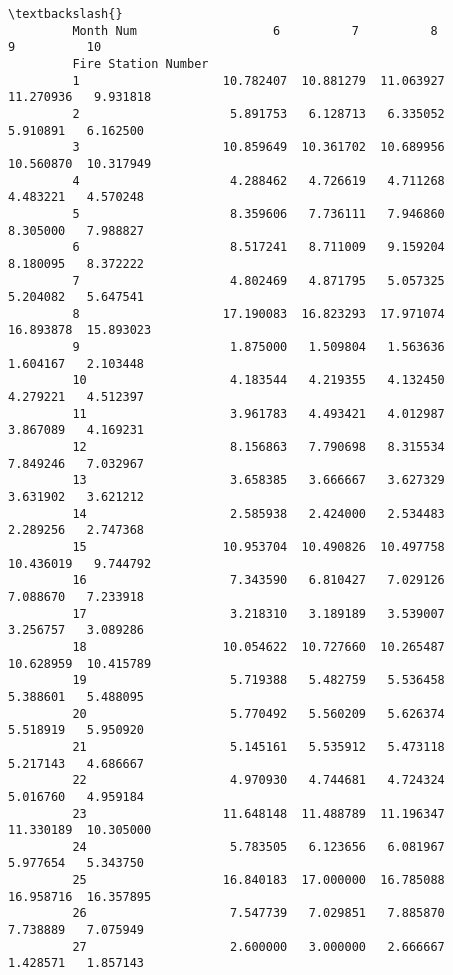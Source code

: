 \documentclass[11pt]{article}
\begin{document}
\begin{Verbatim}[commandchars=\\\{\}]
                                                                                     \textbackslash{}
         Month Num                   6          7          8          9          10   
         Fire Station Number                                                          
         1                    10.782407  10.881279  11.063927  11.270936   9.931818   
         2                     5.891753   6.128713   6.335052   5.910891   6.162500   
         3                    10.859649  10.361702  10.689956  10.560870  10.317949   
         4                     4.288462   4.726619   4.711268   4.483221   4.570248   
         5                     8.359606   7.736111   7.946860   8.305000   7.988827   
         6                     8.517241   8.711009   9.159204   8.180095   8.372222   
         7                     4.802469   4.871795   5.057325   5.204082   5.647541   
         8                    17.190083  16.823293  17.971074  16.893878  15.893023   
         9                     1.875000   1.509804   1.563636   1.604167   2.103448   
         10                    4.183544   4.219355   4.132450   4.279221   4.512397   
         11                    3.961783   4.493421   4.012987   3.867089   4.169231   
         12                    8.156863   7.790698   8.315534   7.849246   7.032967   
         13                    3.658385   3.666667   3.627329   3.631902   3.621212   
         14                    2.585938   2.424000   2.534483   2.289256   2.747368   
         15                   10.953704  10.490826  10.497758  10.436019   9.744792   
         16                    7.343590   6.810427   7.029126   7.088670   7.233918   
         17                    3.218310   3.189189   3.539007   3.256757   3.089286   
         18                   10.054622  10.727660  10.265487  10.628959  10.415789   
         19                    5.719388   5.482759   5.536458   5.388601   5.488095   
         20                    5.770492   5.560209   5.626374   5.518919   5.950920   
         21                    5.145161   5.535912   5.473118   5.217143   4.686667   
         22                    4.970930   4.744681   4.724324   5.016760   4.959184   
         23                   11.648148  11.488789  11.196347  11.330189  10.305000   
         24                    5.783505   6.123656   6.081967   5.977654   5.343750   
         25                   16.840183  17.000000  16.785088  16.958716  16.357895   
         26                    7.547739   7.029851   7.885870   7.738889   7.075949   
         27                    2.600000   3.000000   2.666667   1.428571   1.857143   

\end{Verbatim}
\end{document}

